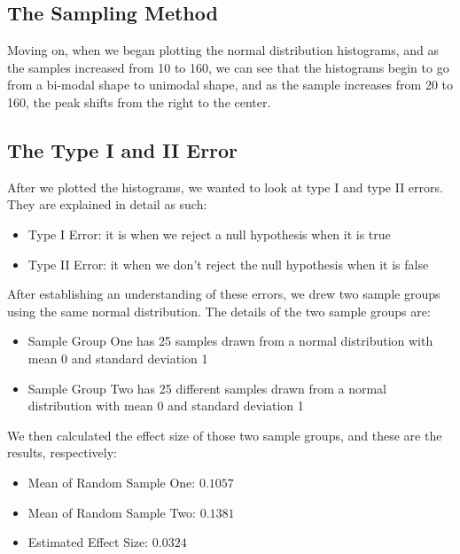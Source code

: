 \documentclass[a4paper,twocolumn]{article}
\begin{document}
\subsection{The Sampling Method}
Moving on, when we began plotting the normal distribution histograms, and as the samples increased from 10 to 160,
we can see that the histograms begin to go from a bi-modal shape to unimodal shape, and as the sample increases from
20 to 160, the peak shifts from the right to the center. 

\subsection{The Type I and II Error}
After we plotted the histograms, we wanted to look at type I and type II errors. They are explained in detail as such:
\begin{itemize}
    \item Type I Error: it is when we reject a null hypothesis when it is true
    \item Type II Error: it when we don't reject the null hypothesis when it is false
\end{itemize}


After establishing an understanding of these errors, we drew two sample groups using the same normal distribution.
The details of the two sample groups are:
\begin{itemize}
    \item Sample Group One has 25 samples drawn from a normal distribution with mean 0 and standard deviation 1
    \item Sample Group Two has 25 different samples drawn from a normal distribution with mean 0 and standard
    deviation 1
\end{itemize}

\newpage

We then calculated the effect size of those two sample groups, and these are the results, respectively:
\begin{itemize}
    \item Mean of Random Sample One:  $0.1057$
    \item Mean of Random Sample Two:  $0.1381$
    \item Estimated Effect Size:  $0.0324$
\end{itemize}
\end{document}
